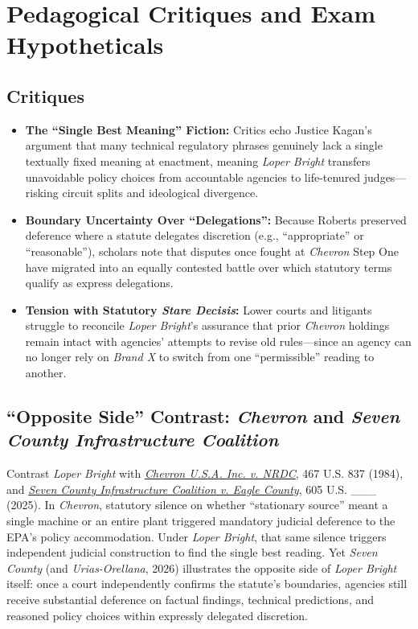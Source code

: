 \documentclass[12pt]{article}
\begin{document}
\section{Pedagogical Critiques and Exam Hypotheticals}

\subsection{Critiques}

\begin{itemize}
  \item \textbf{The ``Single Best Meaning'' Fiction:} Critics echo Justice Kagan's argument that many technical regulatory phrases genuinely lack a single textually fixed meaning at enactment, meaning \textit{Loper Bright} transfers unavoidable policy choices from accountable agencies to life-tenured judges---risking circuit splits and ideological divergence.
  \item \textbf{Boundary Uncertainty Over ``Delegations'':} Because Roberts preserved deference where a statute delegates discretion (e.g., ``appropriate'' or ``reasonable''), scholars note that disputes once fought at \textit{Chevron} Step One have migrated into an equally contested battle over which statutory terms qualify as express delegations.
  \item \textbf{Tension with Statutory \textit{Stare Decisis}:} Lower courts and litigants struggle to reconcile \textit{Loper Bright}'s assurance that prior \textit{Chevron} holdings remain intact with agencies' attempts to revise old rules---since an agency can no longer rely on \textit{Brand X} to switch from one ``permissible'' reading to another.
\end{itemize}

\subsection{``Opposite Side'' Contrast: \textit{Chevron} and \textit{Seven County Infrastructure Coalition}}

Contrast \textit{Loper Bright} with \href{https://supreme.justia.com/cases/federal/us/467/837/}{\textit{Chevron U.S.A. Inc. v. NRDC}}, 467 U.S. 837 (1984), and \href{https://www.supremecourt.gov/opinions/24pdf/23-975_m648.pdf}{\textit{Seven County Infrastructure Coalition v. Eagle County}}, 605 U.S. \_\_\_ (2025). In \textit{Chevron}, statutory silence on whether ``stationary source'' meant a single machine or an entire plant triggered mandatory judicial deference to the EPA's policy accommodation. Under \textit{Loper Bright}, that same silence triggers independent judicial construction to find the single best reading. Yet \textit{Seven County} (and \textit{Urias-Orellana}, 2026) illustrates the opposite side of \textit{Loper Bright} itself: once a court independently confirms the statute's boundaries, agencies still receive substantial deference on factual findings, technical predictions, and reasoned policy choices within expressly delegated discretion.
\end{document}
